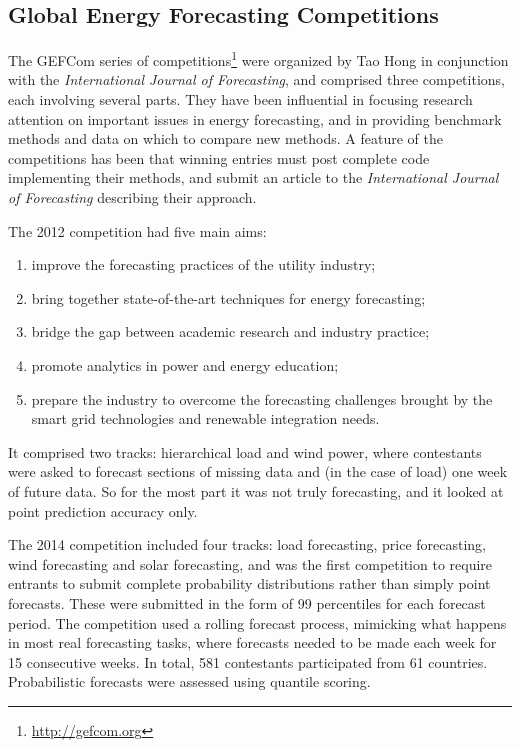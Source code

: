 \documentclass[11pt,a4paper,]{article}
\providecommand{\tightlist}{%
  \setlength{\itemsep}{0pt}\setlength{\parskip}{0pt}}
\begin{document}
\hypertarget{global-energy-forecasting-competitions}{%
\subsection*{Global Energy Forecasting Competitions}\label{global-energy-forecasting-competitions}}

The GEFCom series of competitions\footnote{\url{http://gefcom.org}} were organized by Tao Hong in conjunction with the \emph{International Journal of Forecasting}, and comprised three competitions, each involving several parts. They have been influential in focusing research attention on important issues in energy forecasting, and in providing benchmark methods and data on which to compare new methods. A feature of the competitions has been that winning entries must post complete code implementing their methods, and submit an article to the \emph{International Journal of Forecasting} describing their approach.

The 2012 competition \autocite{gefcom2012} had five main aims:

\begin{enumerate}
\def\labelenumi{\arabic{enumi}.}
\tightlist
\item
  improve the forecasting practices of the utility industry;
\item
  bring together state-of-the-art techniques for energy forecasting;
\item
  bridge the gap between academic research and industry practice;
\item
  promote analytics in power and energy education;
\item
  prepare the industry to overcome the forecasting challenges brought by the smart grid technologies and renewable integration needs.
\end{enumerate}

It comprised two tracks: hierarchical load and wind power, where contestants were asked to forecast sections of missing data and (in the case of load) one week of future data. So for the most part it was not truly forecasting, and it looked at point prediction accuracy only.

The 2014 competition \autocite{gefcom2014} included four tracks: load forecasting, price forecasting, wind forecasting and solar forecasting, and was the first competition to require entrants to submit complete probability distributions rather than simply point forecasts. These were submitted in the form of 99 percentiles for each forecast period. The competition used a rolling forecast process, mimicking what happens in most real forecasting tasks, where forecasts needed to be made each week for 15 consecutive weeks. In total, 581 contestants participated from 61 countries. Probabilistic forecasts were assessed using quantile scoring.
\end{document}
